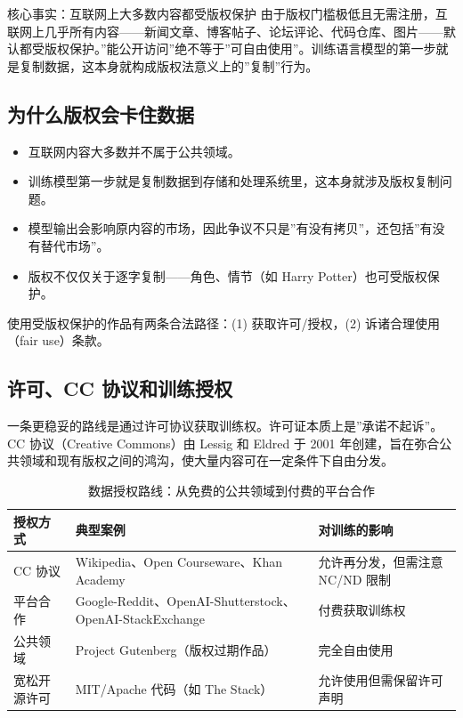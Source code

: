 \documentclass[a4paper]{article}
\begin{document}
\begin{warningbox}{核心事实：互联网上大多数内容都受版权保护}
由于版权门槛极低且无需注册，互联网上几乎所有内容——新闻文章、博客帖子、论坛评论、代码仓库、图片——默认都受版权保护。”能公开访问”绝不等于”可自由使用”。训练语言模型的第一步就是复制数据，这本身就构成版权法意义上的”复制”行为。
\end{warningbox}

\subsection{为什么版权会卡住数据}

\begin{itemize}
    \item 互联网内容大多数并不属于公共领域。
    \item 训练模型第一步就是复制数据到存储和处理系统里，这本身就涉及版权复制问题。
    \item 模型输出会影响原内容的市场，因此争议不只是”有没有拷贝”，还包括”有没有替代市场”。
    \item 版权不仅仅关于逐字复制——角色、情节（如 Harry Potter）也可受版权保护。
\end{itemize}

使用受版权保护的作品有两条合法路径：(1) 获取许可/授权，(2) 诉诸合理使用（fair use）条款。

\subsection{许可、CC 协议和训练授权}

一条更稳妥的路线是通过许可协议获取训练权。许可证本质上是”承诺不起诉”。CC 协议（Creative Commons）由 Lessig 和 Eldred 于 2001 年创建，旨在弥合公共领域和现有版权之间的鸿沟，使大量内容可在一定条件下自由分发。

\begin{table}[H]
\centering
\begin{tabular}{p{}p{}p{}}
\toprule
\textbf{授权方式} & \textbf{典型案例} & \textbf{对训练的影响} \\
\midrule
CC 协议 & Wikipedia、Open Courseware、Khan Academy & 允许再分发，但需注意 NC/ND 限制 \\
平台合作 & Google-Reddit、OpenAI-Shutterstock、OpenAI-StackExchange & 付费获取训练权 \\
公共领域 & Project Gutenberg（版权过期作品） & 完全自由使用 \\
宽松开源许可 & MIT/Apache 代码（如 The Stack） & 允许使用但需保留许可声明 \\
\bottomrule
\end{tabular}
\caption{数据授权路线：从免费的公共领域到付费的平台合作}
\end{table}
\end{document}
